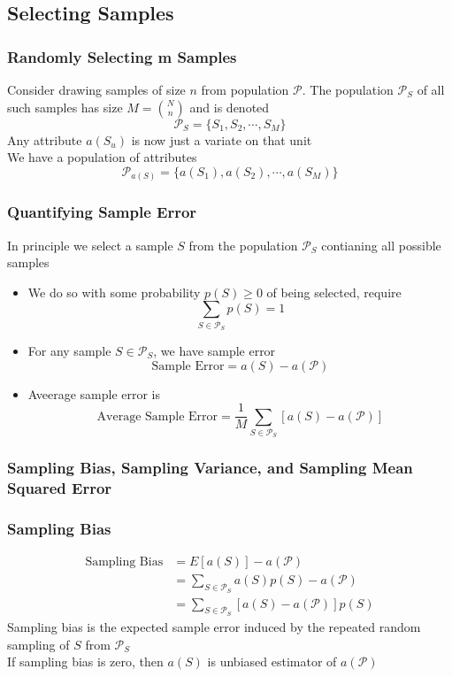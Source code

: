 \documentclass[11pt]{article}
\newcommand{\ds}{\displaystyle}
\begin{document}
\subsection{Selecting Samples}
\subsubsection{Randomly Selecting m Samples}
Consider drawing samples of size $n$ from population $\mathcal{P}$. The population $\mathcal{P}_S$ of all such 
samples has size $M={\ds N\choose n}$ and is denoted \[\mathcal{P}_S=\{S_1,S_2,\cdots,S_M\}\]    
Any attribute $a(S_u)$ is now just a variate on that unit \\
We have a population of attributes 
\[\mathcal{P}_{a(S)} = \{a(S_1),a(S_2),\cdots,a(S_M)\}\]
\subsubsection{Quantifying Sample Error}
In principle we select a sample $S$ from the population $\mathcal{P}_S$ contianing all possible samples 
\begin{itemize}
    \item We do so with some probability $p(S)\geq 0$ of being selected, require \[\sum_{S\in\mathcal{P}_S}p(S)=1\]    
    \item For any sample $S\in\mathcal{P}_S$, we have sample error \[\text{Sample Error}=a(S)-a(\mathcal{P})\]    
    \item Aveerage sample error is \[\text{Average Sample Error} = \frac{1}{M}\sum_{S\in\mathcal{P}_S}[a(S)-a(\mathcal{P})]\]    
\end{itemize}
\subsubsection{Sampling Bias, Sampling Variance, and Sampling Mean Squared Error}
\subsubsection*{Sampling Bias}
\begin{align*}
    \text{Sampling Bias} &= E[a(S)] - a(\mathcal{P}) \\
                         &= \sum_{S\in\mathcal{P}_S}a(S)p(S) - a(\mathcal{P}) \\
                         &= \sum_{S\in\mathcal{P}_S}[a(S)-a(\mathcal{P})]p(S)
\end{align*}
Sampling bias is the expected sample error induced by the repeated random sampling of $S$ from $\mathcal{P}_S$ \\
If sampling bias is zero, then $a(S)$ is unbiased estimator of $a(\mathcal{P})$ 
\end{document}
